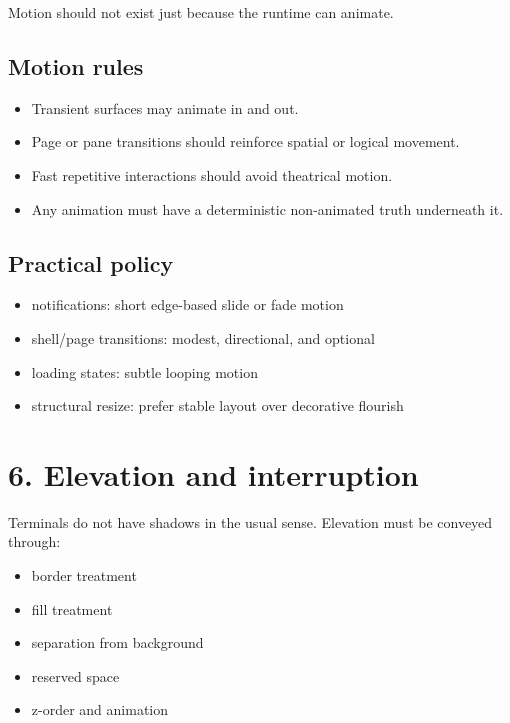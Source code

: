 Motion should not exist just because the runtime can animate.

\subsection{Motion rules}\label{record-021-motion-rules}

\begin{itemize}
\tightlist
\item
  Transient surfaces may animate in and out.
\item
  Page or pane transitions should reinforce spatial or logical movement.
\item
  Fast repetitive interactions should avoid theatrical motion.
\item
  Any animation must have a deterministic non-animated truth underneath it.
\end{itemize}

\subsection{Practical policy}\label{record-021-practical-policy}

\begin{itemize}
\tightlist
\item
  notifications: short edge-based slide or fade motion
\item
  shell/page transitions: modest, directional, and optional
\item
  loading states: subtle looping motion
\item
  structural resize: prefer stable layout over decorative flourish
\end{itemize}

\section{6. Elevation and interruption}\label{record-021-elevation-and-interruption}

Terminals do not have shadows in the usual sense. Elevation must be conveyed through:

\begin{itemize}
\tightlist
\item
  border treatment
\item
  fill treatment
\item
  separation from background
\item
  reserved space
\item
  z-order and animation
\end{itemize}

